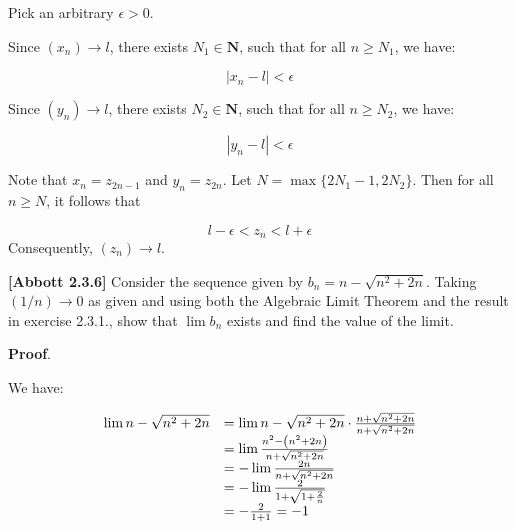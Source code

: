 \documentclass[10pt]{article}
\begin{document}
Pick an arbitrary $\displaystyle \epsilon  >0$.



Since $\displaystyle ( x_{n})\rightarrow l$, there exists $\displaystyle N_{1} \in \mathbf{N}$, such that for all $\displaystyle n\geq N_{1}$, we have:


\begin{equation*}
|x_{n} -l|< \epsilon 
\end{equation*}


Since $\displaystyle ( y_{n})\rightarrow l$, there exists $\displaystyle N_{2} \in \mathbf{N}$, such that for all $\displaystyle n\geq N_{2}$, we have:


\begin{equation*}
|y_{n} -l|< \epsilon 
\end{equation*}


Note that $\displaystyle x_{n} =z_{2n-1}$ and $\displaystyle y_{n} =z_{2n}$. Let $\displaystyle N=\max\{2N_{1} -1,2N_{2}\}$. Then for all $\displaystyle n\geq N$, it follows that 


\begin{equation*}
l-\epsilon < z_{n} < l+\epsilon 
\end{equation*}
Consequently, $\displaystyle ( z_{n})\rightarrow l$.



\textbf{[Abbott 2.3.6]} Consider the sequence given by $\displaystyle b_{n} =n-\sqrt{n^{2} +2n}$. Taking $\displaystyle ( 1/n)\rightarrow 0$ as given and using both the Algebraic Limit Theorem and the result in exercise 2.3.1., show that $\displaystyle \lim b_{n}$ exists and find the value of the limit.



\textbf{Proof}.



We have:


\begin{equation*}
\begin{array}{ c l }
\lim n-\sqrt{n^{2} +2n} & =\lim n-\sqrt{n^{2} +2n} \cdot \frac{n+\sqrt{n^{2} +2n}}{n+\sqrt{n^{2} +2n}}\\
 & =\lim \frac{n^{2} -\left( n^{2} +2n\right)}{n+\sqrt{n^{2} +2n}}\\
 & =-\lim \frac{2n}{n+\sqrt{n^{2} +2n}}\\
 & =-\lim \frac{2}{1+\sqrt{1+\frac{2}{n}}}\\
 & =-\frac{2}{1+1} =-1
\end{array}
\end{equation*}
\end{document}
